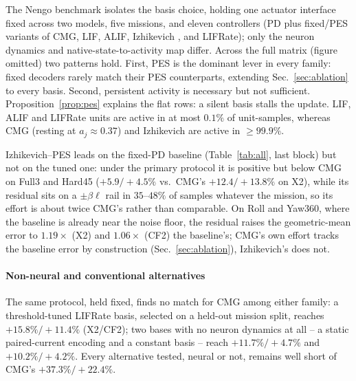 The Nengo benchmark isolates the basis choice, holding one actuator interface fixed across two models, five missions, and eleven controllers (PD plus fixed/PES variants of CMG, LIF, ALIF, Izhikevich \cite{izhikevich2003}, and LIFRate); only the neuron dynamics and native-state-to-activity map differ. Across the full matrix (figure omitted) two patterns hold. First, PES is the dominant lever in every family: fixed decoders rarely match their PES counterparts, extending Sec.~\ref{sec:ablation} to every basis. Second, persistent activity is necessary but not sufficient. Proposition~\ref{prop:pes} explains the flat rows: a silent basis stalls the update. LIF, ALIF and LIFRate units are active in at most $0.1\%$ of unit-samples, whereas CMG (resting at $a_j\approx0.37$) and Izhikevich are active in ${\ge}99.9\%$.

Izhikevich--PES leads on the fixed-PD baseline (Table~\ref{tab:all}, last block) but not on the tuned one: under the primary protocol it is positive but below CMG on Full3 and Hard45 ($+5.9/+4.5\%$ vs.\ CMG's $+12.4/+13.8\%$ on X2), while its residual sits on a $\pm\beta\ell$ rail in $35$--$48\%$ of samples whatever the mission, so its effort is about twice CMG's rather than comparable. On Roll and Yaw360, where the baseline is already near the noise floor, the residual raises the geometric-mean error to $1.19\times$ (X2) and $1.06\times$ (CF2) the baseline's; CMG's own effort tracks the baseline error by construction (Sec.~\ref{sec:ablation}), Izhikevich's does not.

\paragraph{Non-neural and conventional alternatives} The same protocol, held fixed, finds no match for CMG among either family: a threshold-tuned LIFRate basis, selected on a held-out mission split, reaches $+15.8\%/+11.4\%$ (X2/CF2); two bases with no neuron dynamics at all -- a static paired-current encoding and a constant basis -- reach $+11.7\%/+4.7\%$ and $+10.2\%/+4.2\%$. Every alternative tested, neural or not, remains well short of CMG's $+37.3\%/+22.4\%$.

